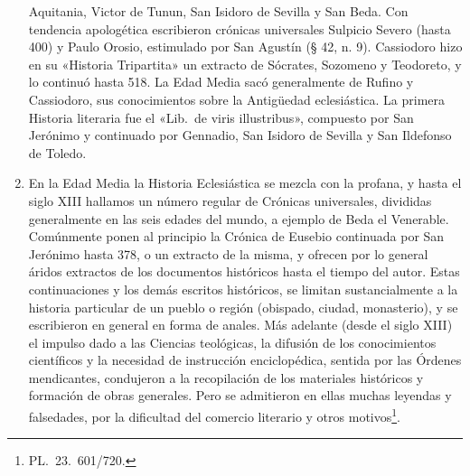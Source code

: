 \raggedbottom{} \documentclass[12pt, a4paper, openany]{book} %
\begin{document}
\begin{enumerate}
Aquitania, Victor de Tunun, San Isidoro de Sevilla y San Beda. Con tendencia apologética escribieron crónicas universales Sulpicio Severo (hasta 400) y Paulo Orosio, estimulado por San Agustín (§ 42, n. 9). Cassiodoro hizo en su «Historia Tripartita» un extracto de Sócrates, Sozomeno y Teodoreto, y lo continuó hasta 518. La Edad Media sacó generalmente de Rufino y Cassiodoro, sus conocimientos sobre la Antigüedad eclesiástica. La primera Historia literaria fue el «Lib.\ de viris illustribus», compuesto por San Jerónimo y continuado por Gennadio, San Isidoro de Sevilla y San Ildefonso de Toledo.
  \item En la Edad Media la Historia Eclesiástica se mezcla con la profana, y hasta el siglo XIII hallamos un número regular de Crónicas universales, divididas generalmente en las seis edades del mundo, a ejemplo de Beda el Venerable. Comúnmente ponen al principio la Crónica de Eusebio continuada por San Jerónimo hasta 378, o un extracto de la misma, y ofrecen por lo general áridos extractos de los documentos históricos hasta el tiempo del autor. Estas continuaciones y los demás escritos históricos, se limitan sustancialmente a la historia particular de un pueblo o región (obispado, ciudad, monasterio), y se escribieron en general en forma de anales. Más adelante (desde el siglo XIII) el impulso dado a las Ciencias teológicas, la difusión de los conocimientos científicos y la necesidad de instrucción enciclopédica, sentida por las Órdenes mendicantes, condujeron a la recopilación de los materiales históricos y formación de obras generales. Pero se admitieron en ellas muchas leyendas y falsedades, por la dificultad del comercio literario y otros motivos\footnote{PL.\ 23.\ 601/720.}.


\end{enumerate}
\end{document}
